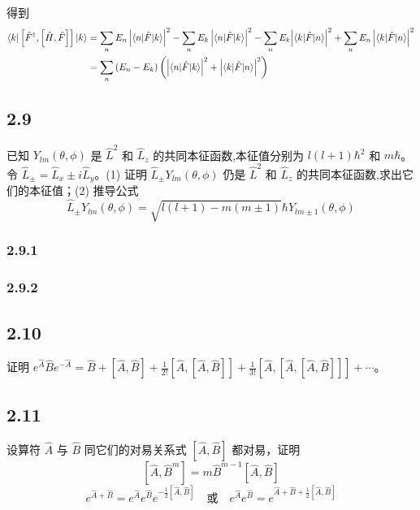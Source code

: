 得到
\begin{equation}
    \begin{aligned}
        \langle k|\left[ \hat{F}^{\dagger},\left[ \hat{H},\hat{F} \right] \right] |k\rangle &=\sum_n{E_n\left| \langle n|\hat{F}|k\rangle \right|^2}-\sum_n{E_k\left| \langle n|\hat{F}|k\rangle \right|^2}-\sum_n{E_k\Bigl| \langle k|\hat{F}|n\rangle \Bigr| ^2}+\sum_n{E_n\left| \langle k|\hat{F}|n\rangle \right|^2}
\\
&=\sum_n{\left( E_n-E_k \right) \left( \left| \langle n|\hat{F}|k\rangle \right|^2+\Bigl| \langle k|\hat{F}|n\rangle \Bigr| ^2 \right)}
    \end{aligned}
\end{equation}









\newpage
\subsection{2.9}
已知 $Y_{lm}(\theta, \phi)$ 是 $\hat{L}^2$ 和 $\hat{L}_z$ 的共同本征函数,本征值分别为 $l(l+1)\hbar^2$ 和 $m\hbar$。令 $\hat{L}_{\pm} = \hat{L}_x \pm i \hat{L}_y$。(1) 证明 $\hat{L}_{\pm} Y_{lm}(\theta, \phi)$ 仍是 $\hat{L}^2$ 和 $\hat{L}_z$ 的共同本征函数,求出它们的本征值；(2) 推导公式
$$\hat{L}_{\pm} Y_{lm}(\theta, \phi) = \sqrt{l(l+1) - m(m \pm 1)} \hbar Y_{l m \pm 1}(\theta, \phi)$$

\subsubsection{2.9.1}

\subsubsection{2.9.2}

\newpage
\subsection{2.10}
证明 $e^{\hat{A}} \hat{B} e^{-\hat{A}} = \hat{B} + [\hat{A}, \hat{B}] + \frac{1}{2!} [\hat{A}, [\hat{A}, \hat{B}]] + \frac{1}{3!} [\hat{A}, [\hat{A}, [\hat{A}, \hat{B}]]] + \cdots$。

\newpage
\subsection{2.11}
设算符 $\hat{A}$ 与 $\hat{B}$ 同它们的对易关系式 $[\hat{A}, \hat{B}]$ 都对易，证明
$$[\hat{A}, \hat{B}^m] = m \hat{B}^{m-1} [\hat{A}, \hat{B}] $$
$$e^{\hat{A} + \hat{B}} = e^{\hat{A}} e^{\hat{B}} e^{-\frac{1}{2} [\hat{A}, \hat{B}]} \quad \text{或} \quad e^{\hat{A}} e^{\hat{B}} = e^{\hat{A} + \hat{B} + \frac{1}{2} [\hat{A}, \hat{B}]} $$


